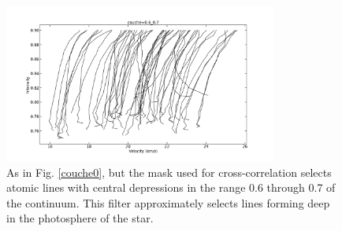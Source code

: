 \documentclass{/Users/art2/TeX/aanda/aa}
\def\kms {km\,s$^{-1}$}
\begin{document}
   \begin{figure}
      \includegraphics[width=0.8\textwidth]{bissecteurcouche06_07.png}
      \caption{As in Fig. \ref{couche0}, but the mask used for cross-correlation selects atomic lines with central depressions in the range 0.6 through 
      0.7 of the continuum. This filter approximately selects lines forming deep in the photosphere of the star.}
      \label{couche6}
      \end{figure}
   
\end{document}
